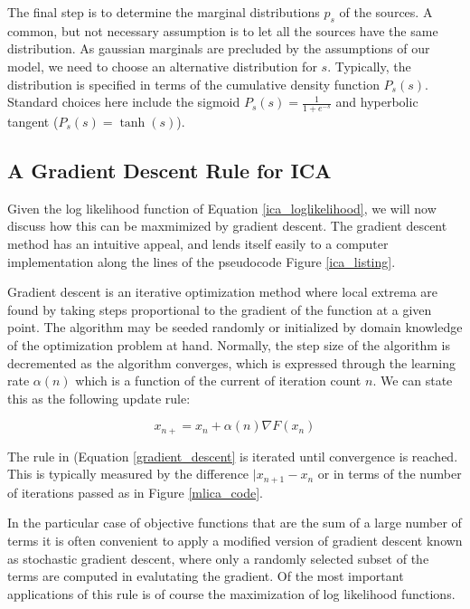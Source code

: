 \documentclass[11pt, oneside, a4paper]{report}
\begin{document}
The final step is to determine the marginal distributions $p_s$ of the sources. 
A common, but not necessary assumption is to let all the sources have the same distribution.
As gaussian marginals are precluded by the assumptions of our model, we need to choose an
alternative distribution for $s$. Typically, the distribution is specified in terms of the 
cumulative density function $P_s(s)$. Standard choices here include the sigmoid 
$P_s(s) = \frac{1}{1+e^{-s}}$ and hyperbolic tangent ($P_s(s) = \tanh(s)$). 

\subsection{A Gradient Descent Rule for ICA}

Given the log likelihood function of Equation \ref{ica_loglikelihood},
we will now discuss how this can be maxmimized by gradient descent. 
The gradient descent method has an intuitive appeal, and  
lends itself easily to a computer implementation along the lines of
the pseudocode Figure \ref{ica_listing}. 

Gradient descent is an iterative optimization method where local extrema are found
by taking steps proportional to the gradient of the function at a given point. 
The algorithm may be seeded randomly or initialized by domain knowledge of the 
optimization problem at hand. Normally, the step size of the algorithm is decremented
as the algorithm converges, which is expressed through the learning rate $\alpha(n)$
which is a function of the current of iteration count $n$. We can state this as the following
update rule:


\begin{equation}
  \label{gradient_descent}
  x_{n+} = x_n + \alpha(n)\nabla F(x_n)
\end{equation}

The rule in (Equation \ref{gradient_descent} is iterated until convergence is reached.
This is typically measured by the difference $|x_{n+1}-x_n$ or in terms of the number of
iterations passed as in Figure \ref{mlica_code}.

In the particular case of objective functions that are the sum of a large number
of terms it is often convenient to apply a modified version of gradient descent
known as stochastic gradient descent, where only a randomly selected subset of the 
terms are computed in evalutating the gradient. Of the most important applications of this
rule is of course the maximization of log likelihood functions.
\end{document}
